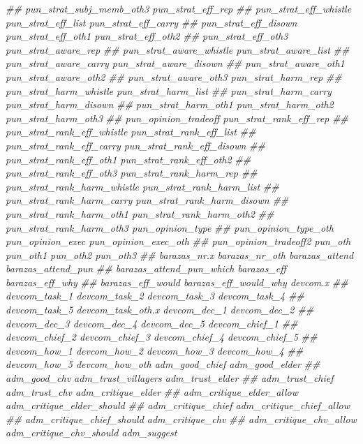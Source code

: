 \documentclass[
]{article}
\newenvironment{Shaded}{\begin{snugshade}}{\end{snugshade}}
\newcommand{\CommentTok}[1]{\textcolor[rgb]{0.56,0.35,0.01}{\textit{#1}}}
\begin{document}
\begin{Shaded}
\begin{Highlighting}[]
\CommentTok{##      pun_strat_subj_memb_oth3 pun_strat_eff_rep}
\CommentTok{##      pun_strat_eff_whistle pun_strat_eff_list pun_strat_eff_carry}
\CommentTok{##      pun_strat_eff_disown pun_strat_eff_oth1 pun_strat_eff_oth2}
\CommentTok{##      pun_strat_eff_oth3 pun_strat_aware_rep}
\CommentTok{##      pun_strat_aware_whistle pun_strat_aware_list}
\CommentTok{##      pun_strat_aware_carry pun_strat_aware_disown}
\CommentTok{##      pun_strat_aware_oth1 pun_strat_aware_oth2}
\CommentTok{##      pun_strat_aware_oth3 pun_strat_harm_rep}
\CommentTok{##      pun_strat_harm_whistle pun_strat_harm_list}
\CommentTok{##      pun_strat_harm_carry pun_strat_harm_disown}
\CommentTok{##      pun_strat_harm_oth1 pun_strat_harm_oth2 pun_strat_harm_oth3}
\CommentTok{##      pun_opinion_tradeoff pun_strat_rank_eff_rep}
\CommentTok{##      pun_strat_rank_eff_whistle pun_strat_rank_eff_list}
\CommentTok{##      pun_strat_rank_eff_carry pun_strat_rank_eff_disown}
\CommentTok{##      pun_strat_rank_eff_oth1 pun_strat_rank_eff_oth2}
\CommentTok{##      pun_strat_rank_eff_oth3 pun_strat_rank_harm_rep}
\CommentTok{##      pun_strat_rank_harm_whistle pun_strat_rank_harm_list}
\CommentTok{##      pun_strat_rank_harm_carry pun_strat_rank_harm_disown}
\CommentTok{##      pun_strat_rank_harm_oth1 pun_strat_rank_harm_oth2}
\CommentTok{##      pun_strat_rank_harm_oth3 pun_opinion_type}
\CommentTok{##      pun_opinion_type_oth pun_opinion_exec pun_opinion_exec_oth}
\CommentTok{##      pun_opinion_tradeoff2 pun_oth pun_oth1 pun_oth2 pun_oth3}
\CommentTok{##      barazas_nr.x barazas_nr_oth barazas_attend barazas_attend_pun}
\CommentTok{##      barazas_attend_pun_which barazas_eff barazas_eff_why}
\CommentTok{##      barazas_eff_would barazas_eff_would_why devcom.x}
\CommentTok{##      devcom_task_1 devcom_task_2 devcom_task_3 devcom_task_4}
\CommentTok{##      devcom_task_5 devcom_task_oth.x devcom_dec_1 devcom_dec_2}
\CommentTok{##      devcom_dec_3 devcom_dec_4 devcom_dec_5 devcom_chief_1}
\CommentTok{##      devcom_chief_2 devcom_chief_3 devcom_chief_4 devcom_chief_5}
\CommentTok{##      devcom_how_1 devcom_how_2 devcom_how_3 devcom_how_4}
\CommentTok{##      devcom_how_5 devcom_how_oth adm_good_chief adm_good_elder}
\CommentTok{##      adm_good_chv adm_trust_villagers adm_trust_elder}
\CommentTok{##      adm_trust_chief adm_trust_chv adm_critique_elder}
\CommentTok{##      adm_critique_elder_allow adm_critique_elder_should}
\CommentTok{##      adm_critique_chief adm_critique_chief_allow}
\CommentTok{##      adm_critique_chief_should adm_critique_chv}
\CommentTok{##      adm_critique_chv_allow adm_critique_chv_should adm_suggest}

\end{Highlighting}
\end{Shaded}
\end{document}
